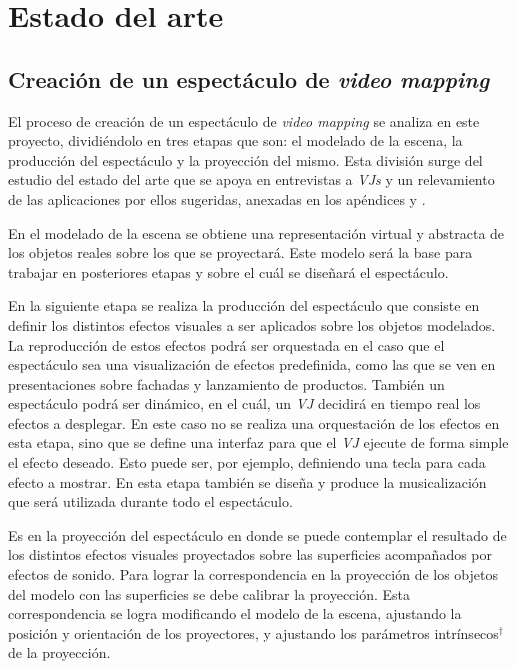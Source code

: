 \chapter{Estado del arte}


\section{Creación de un espectáculo de \emph{video mapping}}

El proceso de creación de un espectáculo de \emph{video mapping} se analiza en este proyecto, dividiéndolo en tres etapas que son: el modelado de la escena, la producción del espectáculo y la proyección del mismo.
Esta división surge del estudio del estado del arte que se apoya en entrevistas a \emph{VJs} y un relevamiento de las aplicaciones por ellos sugeridas, anexadas en los apéndices  y .

En el modelado de la escena se obtiene una representación virtual y abstracta de los objetos reales sobre los que se proyectará.
Este modelo será la base para trabajar en posteriores etapas y sobre el cuál se diseñará el espectáculo.

En la siguiente etapa se realiza la producción del espectáculo que consiste en definir los distintos efectos visuales a ser aplicados sobre los objetos modelados.
La reproducción de estos efectos podrá ser orquestada en el caso que el espectáculo sea una visualización de efectos predefinida, como las que se ven en presentaciones sobre fachadas y lanzamiento de productos.
También un espectáculo podrá ser dinámico, en el cuál, un \emph{VJ} decidirá en tiempo real los efectos a desplegar.
En este caso no se realiza una orquestación de los efectos en esta etapa, sino que se define una interfaz para que el \emph{VJ} ejecute de forma simple el efecto deseado.
Esto puede ser, por ejemplo, definiendo una tecla para cada efecto a mostrar.
En esta etapa también se diseña y produce la musicalización que será utilizada durante todo el espectáculo.

Es en la proyección del espectáculo en donde se puede contemplar el resultado de los distintos efectos visuales proyectados sobre las superficies acompañados por efectos de sonido.
Para lograr la correspondencia en la proyección de los objetos del modelo con las superficies se debe calibrar la proyección.
Esta correspondencia se logra modificando el modelo de la escena, ajustando la posición y orientación de los proyectores, y ajustando los parámetros intrínsecos$^\dagger$ de la proyección.

